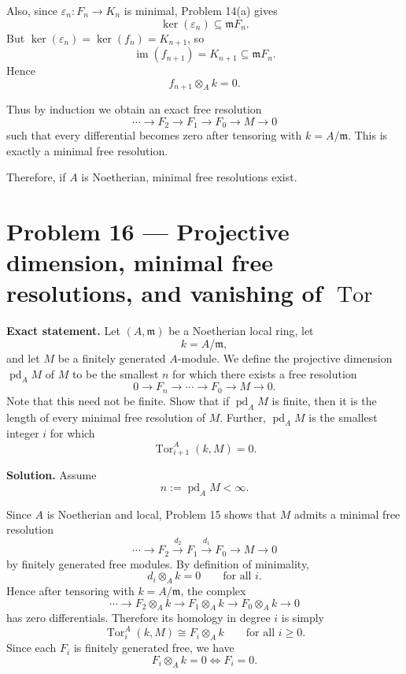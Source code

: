 \documentclass[12pt,a4paper,oneside]{report}
\theoremstyle{notespace}
\begin{document}
Also, since \(\varepsilon_n:F_n\to K_n\) is minimal, Problem 14(a) gives
\[
\ker(\varepsilon_n)\subseteq \mathfrak m F_n.
\]
But \(\ker(\varepsilon_n)=\ker(f_n)=K_{n+1}\), so
\[
\operatorname{im}(f_{n+1})=K_{n+1}\subseteq \mathfrak m F_n.
\]
Hence
\[
f_{n+1}\otimes_A k=0.
\]

Thus by induction we obtain an exact free resolution
\[
\cdots \to F_2\to F_1\to F_0\to M\to 0
\]
such that every differential becomes zero after tensoring with \(k=A/\mathfrak m\). This is exactly a minimal free resolution.

\medskip

Therefore, if \(A\) is Noetherian, minimal free resolutions exist.

\section{Problem 16 --- Projective dimension, minimal free resolutions, and vanishing of \texorpdfstring{$\operatorname{Tor}$}{Tor}}

\textbf{Exact statement.}
Let \((A,\mathfrak m)\) be a Noetherian local ring, let
\[
k=A/\mathfrak m,
\]
and let \(M\) be a finitely generated \(A\)-module. We define the projective dimension \(\operatorname{pd}_A M\) of \(M\) to be the smallest \(n\) for which there exists a free resolution
\[
0\to F_n\to \cdots \to F_0\to M\to 0.
\]
Note that this need not be finite. Show that if \(\operatorname{pd}_A M\) is finite, then it is the length of every minimal free resolution of \(M\). Further, \(\operatorname{pd}_A M\) is the smallest integer \(i\) for which
\[
\operatorname{Tor}_{i+1}^A(k,M)=0.
\]

\textbf{Solution.}
Assume
\[
n:=\operatorname{pd}_A M<\infty.
\]

Since \(A\) is Noetherian and local, Problem 15 shows that \(M\) admits a minimal free resolution
\[
\cdots \longrightarrow F_2 \xrightarrow{d_2} F_1 \xrightarrow{d_1} F_0 \longrightarrow M \longrightarrow 0
\]
by finitely generated free modules. By definition of minimality,
\[
d_i\otimes_A k=0
\qquad\text{for all }i.
\]
Hence after tensoring with \(k=A/\mathfrak m\), the complex
\[
\cdots \longrightarrow F_2\otimes_A k \longrightarrow F_1\otimes_A k \longrightarrow F_0\otimes_A k \longrightarrow 0
\]
has zero differentials. Therefore its homology in degree \(i\) is simply
\[
\operatorname{Tor}_i^A(k,M)\cong F_i\otimes_A k
\qquad\text{for all }i\ge 0.
\]
Since each \(F_i\) is finitely generated free, we have
\[
F_i\otimes_A k=0 \iff F_i=0.
\]
\end{document}
